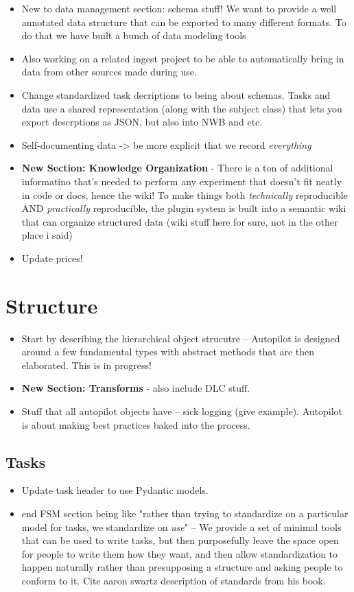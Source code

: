 \begin{itemize}
\item New to data management section: schema stuff! We want to provide a well annotated data structure that can be exported to many different formats. To do that we have built a bunch of data modeling tools
\item Also working on a related ingest project to be able to automatically bring in data from other sources made during use. 
\item Change standardized task decriptions to being about schemas. Tasks and data use a shared representation (along with the subject class) that lets you export descrptions as JSON, but also into NWB and etc.
\item Self-documenting data -> be more explicit that we record \textit{everything}
\item \textbf{New Section: Knowledge Organization} - There is a ton of additional informatino that's needed to perform any experiment that doesn't fit neatly in code or docs, hence the wiki! To make things both \textit{technically} reproducible AND \textit{practically} reproducible, the plugin system is built into a semantic wiki that can organize structured data (wiki stuff here for sure, not in the other place i said)
\item Update prices!
\end{itemize}

\section{Structure}

\begin{itemize}
\item Start by describing the hierarchical object strucutre -- Autopilot is designed around a few fundamental types with abstract methods that are then elaborated. This is in progress!
\item \textbf{New Section: Transforms} - also include DLC stuff.
\item Stuff that all autopilot objects have -- sick logging (give example). Autopilot is about making best practices baked into the process. 
\end{itemize}

\subsection{Tasks}

\begin{itemize}
\item Update task header to use Pydantic models.
\item end FSM section being like "rather than trying to standardize on a particular model for tasks, we standardize on \textit{use}" -- We provide a set of minimal tools that can be used to write tasks, but then purposefully leave the space open for people to write them how they want, and then allow standardization to happen naturally rather than presupposing a structure and asking people to conform to it. Cite aaron swartz description of standards from his book.
\end{itemize}

